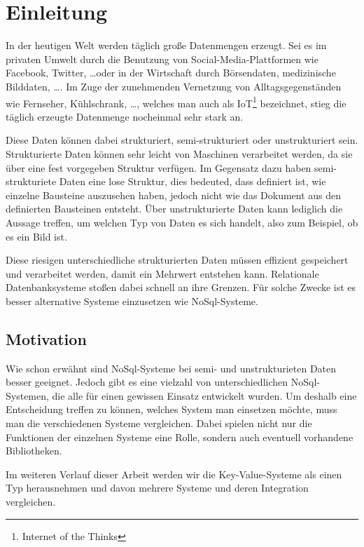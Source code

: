 \chapter{Einleitung}

In der heutigen Welt werden täglich große Datenmengen erzeugt. Sei es im
privaten Umwelt durch die Benutzung von Social-Media-Plattformen wie Facebook,
Twitter, \ldots oder in der Wirtschaft durch Börsendaten, medizinische
Bilddaten, \ldots . Im Zuge der zunehmenden Vernetzung von
Alltagsgegenständen wie Fernseher, Kühlschrank, \ldots, welches man auch als
IoT\footnote{Internet of the Thinks} bezeichnet, stieg die täglich erzeugte
Datenmenge nocheinmal sehr stark an.

Diese Daten können dabei strukturiert, semi-strukturiert oder unstrukturiert
sein. Strukturierte Daten können sehr leicht von Maschinen verarbeitet werden,
da sie über eine fest vorgegeben Struktur verfügen. Im Gegensatz dazu haben
semi-strukturiete Daten eine lose Struktur, dies bedeuted, dass definiert ist,
wie einzelne Bausteine auszusehen haben, jedoch nicht wie das Dokument aus den
definierten Bausteinen entsteht. Über unstrukturierte Daten kann lediglich die
Aussage treffen, um welchen Typ von Daten es sich handelt, also zum Beispiel,
ob es ein Bild ist.

Diese riesigen unterschiedliche strukturierten Daten müssen effizient
gespeichert und verarbeitet werden, damit ein Mehrwert entstehen kann.
Relationale Datenbanksysteme stoßen dabei schnell an ihre Grenzen. Für solche
Zwecke ist es besser alternative Systeme einzusetzen wie NoSql-Systeme.

\section{Motivation}

Wie schon erwähnt sind NoSql-Systeme bei semi- und unstrukturieten Daten besser
geeignet. Jedoch gibt es eine vielzahl von unterschiedlichen NoSql-Systemen,
die alle für einen gewissen Einsatz entwickelt wurden. Um deshalb eine
Entscheidung treffen zu können, welches System man einsetzen möchte, muss man
die verschiedenen Systeme vergleichen. Dabei spielen nicht nur die Funktionen
der einzelnen Systeme eine Rolle, sondern auch eventuell vorhandene
Bibliotheken.

Im weiteren Verlauf dieser Arbeit werden wir die Key-Value-Systeme als einen
Typ herausnehmen und davon mehrere Systeme und deren Integration vergleichen.

